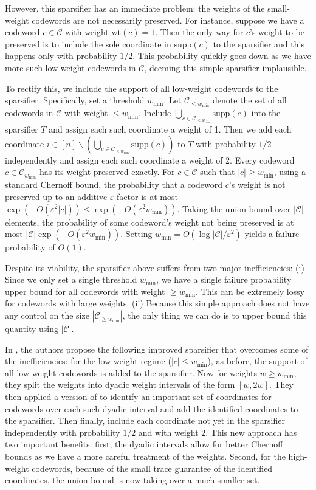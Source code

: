 \documentclass{article}
\newcommand{\<}{\langle}
\renewcommand{\>}{\rangle}
\newcommand{\calC}{\mathcal{C}}
\newcommand{\supp}{\mathrm{supp}}
\begin{document}
However, this sparsifier has an immediate problem: the weights of the small-weight codewords are not necessarily preserved. For instance, suppose we have a codeword $c \in \calC$ with weight $\mathrm{wt}(c) = 1$. Then the only way for $c$'s weight to be preserved is to include the sole coordinate in $\supp (c)$ to the sparsifier and this happens only with probability $ 1/ 2$. This probability quickly goes down as we have more such low-weight codewords in $\calC$, deeming this simple sparsifier implausible.

To rectify this, we include the support of all low-weight codewords to the sparsifier. Specifically, set a threshold $w_{\min}$. Let $\calC_{\leq w_{\min }}$ denote the set of all codewords in $\calC$ with weight $\leq w_{\min}$. Include $\bigcup_{c \in \calC_{\leq w_{\min}}}\supp (c)$ into the sparsifier $T$ and assign each such coordinate a weight of 1. Then we add each coordinate $i \in [n] \backslash (\bigcup_{c \in \calC_{\leq w_{\min}}}\supp (c))$ to $T$ with probability $1/2$ independently and assign each such coordinate a weight of 2. Every codeword $c \in \calC_{w_{\min}}$ has its weight preserved exactly. For $c \in \calC$ such that $|c| \geq w_{\min}$, using a standard Chernoff bound, the probability that a codeword $c$'s weight is not preserved up to an additive $\varepsilon$ factor is at most $\exp (-O(\varepsilon^2 |c|) ) \leq \exp (-O(\varepsilon^2 w_{\min}) )$. Taking the union bound over $|\calC|$ elements, the probability of some codeword's weight not being preserved is at most $|\calC|  \exp (-O(\varepsilon^2 w_{\min}) ) $. Setting $w_{\min} = O(\log |\calC| / \varepsilon^2)$ yields a failure probability of $O(1)$.

Despite its viability, the sparsifier above suffers from two major inefficiencies: (i) Since we only set a single threshold $w_{\min}$, we have a single failure probability upper bound for all codewords with weight $\geq w_{\min}$. This can be extremely lossy for codewords with large weights. (ii) Because this simple approach does not have any control on the size $|\calC_{\geq w_{\min}}|$, the only thing we can do is to upper bound this quantity using $|\calC|$.


In \cite{BG25}, the authors propose the following improved sparsifier that overcomes some of the inefficiencies: for the low-weight regime ($|c| \leq w_{\min}$),  as before, the support of all low-weight codewords is added to the sparsifier. Now for weights $w \geq w_{\min}$, they split the weights into dyadic weight intervals of the form $[w, 2w]$. They then applied a version of  to identify an important set of coordinates for codewords over each such dyadic interval and add the identified coordinates to the sparsifier. Then finally, include each coordinate not yet in the sparsifier independently with probability $1/2$ and with weight $2$. This new approach has two important benefits: first, the dyadic intervals allow for better Chernoff bounds as we have a more careful treatment of the weights. Second, for the high-weight codewords, because of the small trace guarantee of the identified coordinates, the union bound is now taking over a much smaller set.
\end{document}
